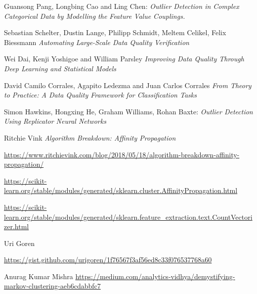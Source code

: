 \documentclass{article}
\begin{document}
\begin{thebibliography}{999}

    Guansong Pang, Longbing Cao and Ling Chen:
    \emph{Outlier Detection in Complex Categorical Data
        by Modelling the Feature Value Couplings.}

    Sebastian Schelter, Dustin Lange, Philipp Schmidt, Meltem Celikel, Felix Biessmann
    \emph{Automating Large-Scale Data Quality Verification}

    Wei Dai, Kenji Yoshigoe and William Parsley
    \emph{Improving Data Quality Through Deep Learning and Statistical Models}

    David Camilo Corrales, Agapito Ledezma and Juan Carlos Corrales
    \emph{From Theory to Practice: A Data Quality Framework
        for Classification Tasks}

    Simon Hawkins, Hongxing He, Graham Williams, Rohan Baxte:
    \emph{Outlier Detection Using Replicator Neural Networks}

    Ritchie Vink
    \emph{Algorithm Breakdown: Affinity Propagation}

    \url{https://www.ritchievink.com/blog/2018/05/18/algorithm-breakdown-affinity-propagation/}

    \url{https://scikit-learn.org/stable/modules/generated/sklearn.cluster.AffinityPropagation.html}

    \url{https://scikit-learn.org/stable/modules/generated/sklearn.feature_extraction.text.CountVectorizer.html}

    Uri Goren

    \url{https://gist.github.com/urigoren/1f76567f3af56ed8c33f076537768a60}

    Anurag Kumar Mishra
    \url{https://medium.com/analytics-vidhya/demystifying-markov-clustering-aeb6cdabbfc7}

\end{thebibliography}
\end{document}
